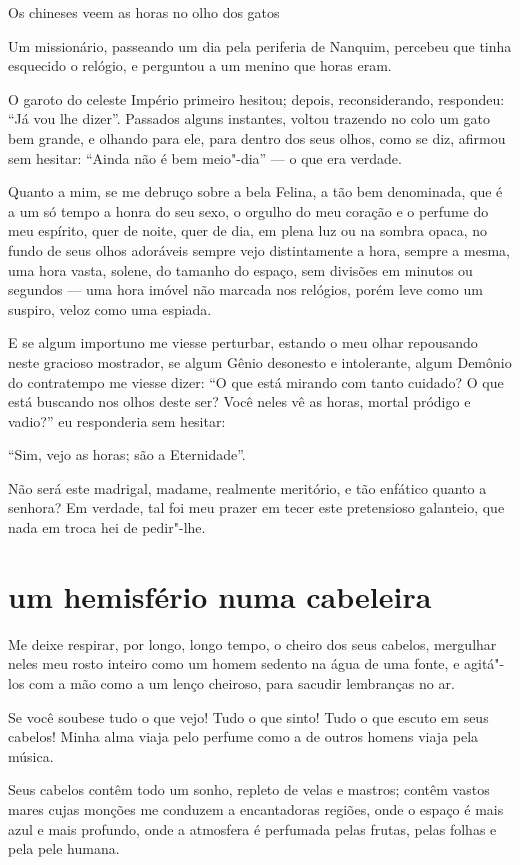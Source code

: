 Os chineses veem as horas no olho dos gatos

Um missionário, passeando um dia pela periferia de Nanquim, percebeu que
tinha esquecido o relógio, e perguntou a um menino que horas eram.

O garoto do celeste Império primeiro hesitou; depois, reconsiderando,
respondeu: ``Já vou lhe dizer''. Passados
alguns instantes, voltou trazendo no colo um gato bem grande, e
olhando para ele, para dentro dos seus olhos, como se diz, afirmou sem
hesitar: ``Ainda não é bem meio"-dia'' --- o
que era verdade.

Quanto a mim, se me debruço sobre a bela Felina, a tão bem denominada,
que é a um só tempo a honra do seu sexo, o orgulho do meu coração e o
perfume do meu espírito, quer de noite, quer de dia, em plena luz ou na
sombra opaca, no fundo de seus olhos adoráveis sempre vejo
distintamente a hora, sempre a mesma, uma hora vasta, solene, do tamanho do espaço, sem divisões em minutos ou segundos --- uma hora imóvel
não marcada nos relógios, porém leve como um suspiro,
veloz como uma espiada.

E se algum importuno me viesse perturbar, estando o meu olhar
repousando neste gracioso mostrador, se algum Gênio desonesto e
intolerante, algum Demônio do contratempo me viesse dizer:
``O que está mirando com tanto cuidado? O que está
buscando nos olhos deste ser? Você neles vê as horas, mortal pródigo
e vadio?'' eu responderia sem hesitar: 

``Sim,
vejo as horas; são a Eternidade''.

Não será este madrigal, madame, realmente meritório, e tão enfático
quanto a senhora? Em verdade, tal foi meu prazer em tecer este
pretensioso galanteio, que nada em troca hei de pedir"-lhe.

\quebra\section[Um hemisfério numa cabeleira]{um hemisfério numa cabeleira}

Me deixe respirar, por longo, longo tempo, o cheiro dos seus cabelos,
mergulhar neles meu rosto inteiro como um homem sedento na água de uma
fonte, e agitá"-los com a mão como a um lenço cheiroso, para
sacudir lembranças no ar.

Se você soubese tudo o que vejo! Tudo o que sinto! Tudo o que escuto
em seus cabelos! Minha alma viaja pelo perfume como a de
outros homens viaja pela música.

Seus cabelos contêm todo um sonho, repleto de velas e mastros; contêm
vastos mares cujas monções me conduzem a encantadoras regiões, onde o
espaço é mais azul e mais profundo, onde a atmosfera é perfumada pelas
frutas, pelas folhas e pela pele humana.

